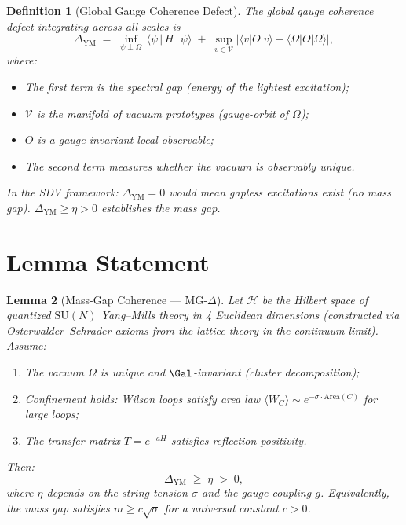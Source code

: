 \documentclass[11pt]{article}
\newtheorem{lemma}{Lemma}
\newtheorem{definition}[lemma]{Definition}
\theoremstyle{definition}
\begin{document}
\begin{definition}[Global Gauge Coherence Defect]
\label{def:global-ym-defect}
The \emph{global gauge coherence defect} integrating across all scales is
\[
  \Delta_{\mathrm{YM}} \;=\; \inf_{\psi \perp \Omega} \,
  \bigl\langle \psi \,\big|\, H \,\big|\, \psi \bigr\rangle
  \;+\;
  \sup_{v \in \mathcal{V}} \bigl| \langle v | O | v \rangle - \langle \Omega | O | \Omega \rangle \bigr|,
\]
where:
\begin{itemize}
  \item The first term is the spectral gap (energy of the lightest excitation);
  \item $\mathcal{V}$ is the manifold of vacuum prototypes (gauge-orbit of $\Omega$);
  \item $O$ is a gauge-invariant local observable;
  \item The second term measures whether the vacuum is observably unique.
\end{itemize}

In the SDV framework: $\Delta_{\mathrm{YM}} = 0$ would mean gapless excitations exist
(no mass gap).  $\Delta_{\mathrm{YM}} \geq \eta > 0$ establishes the mass gap.
\end{definition}

\section{Lemma Statement}

\begin{lemma}[Mass-Gap Coherence --- MG-$\Delta$]
\label{lem:MG}
Let $\mathcal{H}$ be the Hilbert space of quantized $\mathrm{SU}(N)$ Yang--Mills theory
in 4 Euclidean dimensions (constructed via Osterwalder--Schrader axioms from the lattice
theory in the continuum limit).  Assume:
\begin{enumerate}
  \item[(H1)] The vacuum $\Omega$ is unique and $\Gal$-invariant (cluster decomposition);
  \item[(H2)] Confinement holds: Wilson loops satisfy area law
    $\langle W_C \rangle \sim e^{-\sigma \cdot \mathrm{Area}(C)}$ for large loops;
  \item[(H3)] The transfer matrix $T = e^{-aH}$ satisfies reflection positivity.
\end{enumerate}
Then:
\[
  \Delta_{\mathrm{YM}} \;\geq\; \eta \;>\; 0,
\]
where $\eta$ depends on the string tension $\sigma$ and the gauge coupling $g$.
Equivalently, the mass gap satisfies $m \geq c \sqrt{\sigma}$ for a universal constant $c > 0$.
\end{lemma}
\end{document}
